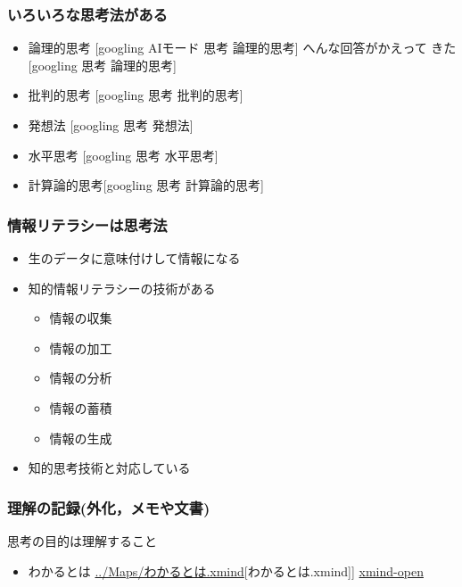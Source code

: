 \documentclass[dvipdfmx,11pat]{jarticle}
\begin{document}
\subsubsection{いろいろな思考法がある}
\label{sec:org9b817dd}
\begin{itemize}
\item 論理的思考  [googling AIモード 思考 論理的思考] へんな回答がかえって
きた
{[}googling 思考 論理的思考]
\item 批判的思考 [googling 思考 批判的思考]
\item 発想法 [googling 思考 発想法]
\item 水平思考 [googling 思考 水平思考]
\item 計算論的思考[googling 思考 計算論的思考]
\end{itemize}
\subsubsection{情報リテラシーは思考法}
\label{sec:org5fe8f2e}
\begin{itemize}
\item 生のデータに意味付けして情報になる
\item 知的情報リテラシーの技術がある
\begin{itemize}
\item 情報の収集
\item 情報の加工
\item 情報の分析
\item 情報の蓄積
\item 情報の生成
\end{itemize}
\item 知的思考技術と対応している
\end{itemize}
\subsubsection{理解の記録(外化，メモや文書)}
\label{sec:orgb2dc1b3}
思考の目的は理解すること
\begin{itemize}
\item わかるとは \url{../Maps/わかるとは.xmind}{[}わかるとは.xmind]]  \href{shell:xmind ../Maps/わかるとは.xmind}{xmind-open}
\end{itemize}
\end{document}
